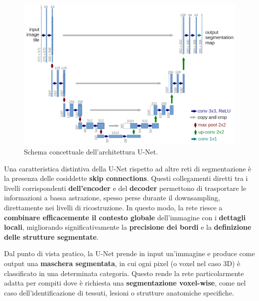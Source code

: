\begin{figure}[H]
  	\centering 
 	\includegraphics[width=.6\textwidth]{figures/U-Net-architecture.png} 
	 \caption{Schema concettuale dell'architettura U-Net.}
	 \label{fig:Schema concettuale dell'architettura U-Net}
	\end{figure} 

Una caratteristica distintiva della U-Net rispetto ad altre reti di segmentazione è la presenza delle cosiddette \textbf{skip connections}. Questi collegamenti diretti tra i livelli corrispondenti \textbf{dell’encoder} e del \textbf{decoder} permettono di trasportare le informazioni a bassa astrazione, spesso perse durante il downsampling, direttamente nei livelli di ricostruzione. In questo modo, la rete riesce a \textbf{combinare efficacemente il contesto globale} dell’immagine con i \textbf{dettagli locali}, migliorando significativamente la \textbf{precisione dei bordi} e la \textbf{definizione delle strutture segmentate}.

Dal punto di vista pratico, la U-Net prende in input un’immagine e produce come output una \textbf{maschera segmentata}, in cui ogni pixel (o voxel nel caso 3D) è classificato in una determinata categoria. Questo rende la rete particolarmente adatta per compiti dove è richiesta una \textbf{segmentazione voxel-wise}, come nel caso dell’identificazione di tessuti, lesioni o strutture anatomiche specifiche.


